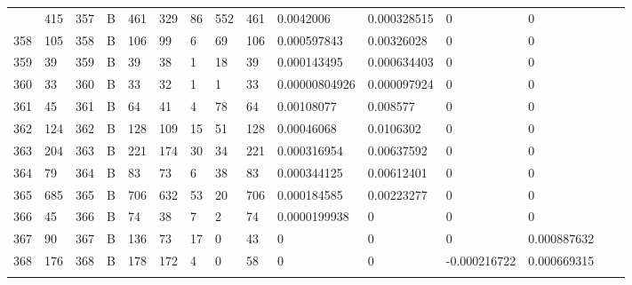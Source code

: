 \begin{longtable}{lllllllllllllll}
\begin{comment}
	357 & 415               & 357 & B   & 461               & 329               & 86                & 552  & 461        & 0.0042006      & 0.000328515    & 0             & 0            \\
	358 & 105               & 358 & B   & 106               & 99                & 6                 & 69   & 106        & 0.000597843    & 0.00326028     & 0             & 0            \\
	359 & 39                & 359 & B   & 39                & 38                & 1                 & 18   & 39         & 0.000143495    & 0.000634403    & 0             & 0            \\
	360 & 33                & 360 & B   & 33                & 32                & 1                 & 1    & 33         & 0.00000804926  & 0.000097924    & 0             & 0            \\
	361 & 45                & 361 & B   & 64                & 41                & 4                 & 78   & 64         & 0.00108077     & 0.008577       & 0             & 0            \\
	362 & 124               & 362 & B   & 128               & 109               & 15                & 51   & 128        & 0.00046068     & 0.0106302      & 0             & 0            \\
	363 & 204               & 363 & B   & 221               & 174               & 30                & 34   & 221        & 0.000316954    & 0.00637592     & 0             & 0            \\
	364 & 79                & 364 & B   & 83                & 73                & 6                 & 38   & 83         & 0.000344125    & 0.00612401     & 0             & 0            \\
	365 & 685               & 365 & B   & 706               & 632               & 53                & 20   & 706        & 0.000184585    & 0.00223277     & 0             & 0            \\
	366 & 45                & 366 & B   & 74                & 38                & 7                 & 2    & 74         & 0.0000199938   & 0              & 0             & 0            \\
	367 & 90                & 367 & B   & 136               & 73                & 17                & 0    & 43         & 0              & 0              & 0             & 0.000887632  \\
	368 & 176               & 368 & B   & 178               & 172               & 4                 & 0    & 58         & 0              & 0              & -0.000216722  & 0.000669315  \\

\end{comment}
\end{longtable}
